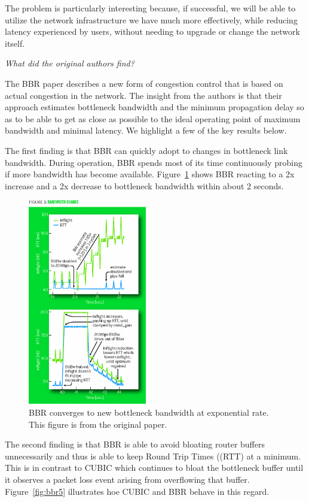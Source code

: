 The problem is particularly interesting because, if successful, we will be able
to utilize the network infrastructure we have much more effectively, while
reducing latency experienced by users, without needing to upgrade or change
the network itself.

\emph{What did the original authors find?}

The BBR paper describes a new form of congestion control that is based on actual
congestion in the network. The insight from the authors is that their
approach estimates bottleneck bandwidth and the minimum propagation delay
so as to be able to get as close as possible to the ideal operating point of
maximum bandwidth and minimal latency. We highlight a few of the key
results below.

The first finding is that BBR can quickly adopt to changes in bottleneck link
bandwidth. During operation, BBR spends most of its time continuously probing
if more bandwidth has become available. Figure~\ref{fig:bbr3} shows BBR
reacting to a 2x increase and a 2x decrease to bottleneck bandwidth within
about 2 seconds.

\begin{figure}[h]
  \centering
  \includegraphics[height=9cm]{./img/bbr_fig3.png}
  \caption{BBR converges to new bottleneck bandwidth at exponential rate.
  This figure is from the original paper.}
  \label{fig:bbr3}
\end{figure}

The second finding is that BBR is able to avoid bloating router buffers
unnecessarily and thus is able to keep Round Trip Times ((RTT) at a minimum. This is in contrast to
CUBIC which continues to bloat the bottleneck buffer until it observes a
packet loss event arising from overflowing that buffer. Figure~\ref{fig:bbr5} illustrates
hoe CUBIC and BBR behave in this regard.

